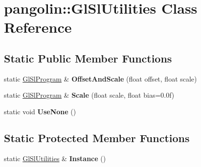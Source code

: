 \hypertarget{classpangolin_1_1_gl_sl_utilities}{}\section{pangolin\+:\+:Gl\+Sl\+Utilities Class Reference}
\label{classpangolin_1_1_gl_sl_utilities}
\subsection*{Static Public Member Functions}
\begin{DoxyCompactItemize}
\item 
static \hyperlink{classpangolin_1_1_gl_sl_program}{Gl\+Sl\+Program} \& {\bfseries Offset\+And\+Scale} (float offset, float scale)\hypertarget{classpangolin_1_1_gl_sl_utilities_a356bb5a64cdf95e7188a5e29b69b5701}{}\label{classpangolin_1_1_gl_sl_utilities_a356bb5a64cdf95e7188a5e29b69b5701}

\item 
static \hyperlink{classpangolin_1_1_gl_sl_program}{Gl\+Sl\+Program} \& {\bfseries Scale} (float scale, float bias=0.\+0f)\hypertarget{classpangolin_1_1_gl_sl_utilities_a7637bc12aec59edd4fdfae4dc7c99164}{}\label{classpangolin_1_1_gl_sl_utilities_a7637bc12aec59edd4fdfae4dc7c99164}

\item 
static void {\bfseries Use\+None} ()\hypertarget{classpangolin_1_1_gl_sl_utilities_aad4e8128902561b1a3ab48a1fc8a6412}{}\label{classpangolin_1_1_gl_sl_utilities_aad4e8128902561b1a3ab48a1fc8a6412}

\end{DoxyCompactItemize}
\subsection*{Static Protected Member Functions}
\begin{DoxyCompactItemize}
\item 
static \hyperlink{classpangolin_1_1_gl_sl_utilities}{Gl\+Sl\+Utilities} \& {\bfseries Instance} ()\hypertarget{classpangolin_1_1_gl_sl_utilities_af4c5f3055d06baec8964cca3fcffd2e7}{}\label{classpangolin_1_1_gl_sl_utilities_af4c5f3055d06baec8964cca3fcffd2e7}

\end{DoxyCompactItemize}
